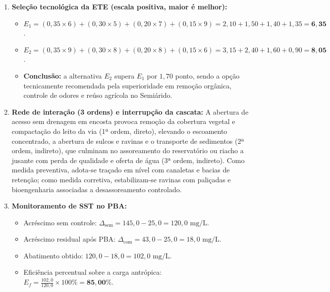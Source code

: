 \begin{boxGabarito}
\begin{enumerate}[leftmargin=1.8em, itemsep=4pt]
    \item \textbf{Seleção tecnológica da ETE (escala positiva, maior é melhor):}
    \begin{itemize}[leftmargin=1.4em, itemsep=1pt]
      \item $E_1 = (0{,}35 \times 6) + (0{,}30 \times 5) + (0{,}20 \times 7) + (0{,}15 \times 9) = 2{,}10 + 1{,}50 + 1{,}40 + 1{,}35 = \mathbf{6{,}35}$.
      \item $E_2 = (0{,}35 \times 9) + (0{,}30 \times 8) + (0{,}20 \times 8) + (0{,}15 \times 6) = 3{,}15 + 2{,}40 + 1{,}60 + 0{,}90 = \mathbf{8{,}05}$.
      \item \textbf{Conclusão:} a alternativa $E_2$ supera $E_1$ por $1{,}70$ ponto, sendo a opção tecnicamente recomendada pela superioridade em remoção orgânica, controle de odores e reúso agrícola no Semiárido.
    \end{itemize}

    \item \textbf{Rede de interação (3 ordens) e interrupção da cascata:}
    A abertura de acesso sem drenagem em encosta provoca remoção da cobertura vegetal e compactação do leito da via (1ª ordem, direto), elevando o escoamento concentrado, a abertura de sulcos e ravinas e o transporte de sedimentos (2ª ordem, indireto), que culminam no assoreamento do reservatório ou riacho a jusante com perda de qualidade e oferta de água (3ª ordem, indireto). Como medida preventiva, adota-se traçado em nível com canaletas e bacias de retenção; como medida corretiva, estabilizam-se ravinas com paliçadas e bioengenharia associadas a desassoreamento controlado.

    \item \textbf{Monitoramento de SST no PBA:}
    \begin{itemize}[leftmargin=1.4em, itemsep=1pt]
      \item Acréscimo sem controle: $\Delta_{\text{sem}} = 145{,}0 - 25{,}0 = 120{,}0\text{ mg/L}$.
      \item Acréscimo residual após PBA: $\Delta_{\text{com}} = 43{,}0 - 25{,}0 = 18{,}0\text{ mg/L}$.
      \item Abatimento obtido: $120{,}0 - 18{,}0 = 102{,}0\text{ mg/L}$.
      \item Eficiência percentual sobre a carga antrópica: $E_f = \frac{102{,}0}{120{,}0} \times 100\% = \mathbf{85{,}00\%}$.
    \end{itemize}
  \end{enumerate}
\end{boxGabarito}

